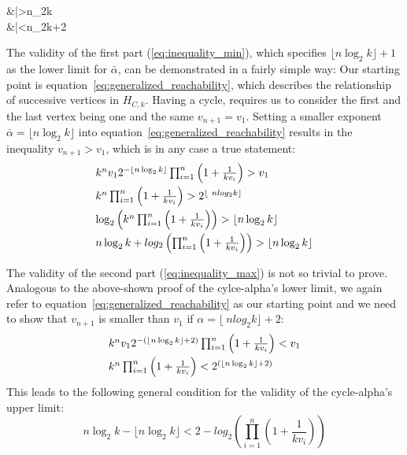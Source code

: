 \begin{samepage}
	\begin{flalign}
	\label{eq:inequality_min}
	&\bar\alpha>\lfloor n\log_2k\rfloor\\	
	\label{eq:inequality_max}
	&\bar\alpha<\lfloor n\log_2k\rfloor+2
	\end{flalign}
\end{samepage}

The validity of the first part (\ref{eq:inequality_min}), which specifies $\lfloor n\log_2k\rfloor+1$ as the lower limit for $\bar\alpha$, can be demonstrated in a fairly simple way: Our starting point is equation~\ref{eq:generalized_reachability}, which describes the relationship of successive vertices in $H_{C,k}$. Having a cycle, requires us to consider the first and the last vertex being one and the same $v_{n+1}=v_1$. Setting a smaller exponent $\bar\alpha=\lfloor n\log_2k\rfloor$ into equation~\ref{eq:generalized_reachability} results in the inequality $v_{n+1}>v_1$, which is in any case a true statement:
\begin{equation*}
\begin{array}{l}
k^nv_12^{-\lfloor n\log_2k\rfloor}\prod_{i=1}^{n}\left(1+\frac{1}{kv_{i}}\right)>v_1
\\[\medskipamount]
k^n\prod_{i=1}^{n}\left(1+\frac{1}{kv_{i}}\right)>2^{\lfloor\ nlog_2k\rfloor}
\\[\medskipamount]
\log_2\left(k^n\prod_{i=1}^{n}\left(1+\frac{1}{kv_{i}}\right)\right)>\lfloor n\log_2k\rfloor
\\[\medskipamount]
n\log_2k+log_2\left(\prod_{i=1}^{n}\left(1+\frac{1}{kv_{i}}\right)\right)>\lfloor n\log_2k\rfloor
\end{array}	
\end{equation*}

The validity of the second part (\ref{eq:inequality_max}) is not so trivial to prove. Analogous to the above-shown proof of the cylce-alpha's lower limit, we again refer to equation~\ref{eq:generalized_reachability} as our starting point and we need to show that $v_{n+1}$ is smaller than $v_1$ if $\alpha=\lfloor\ nlog_2k\rfloor+2$:
\begin{equation*}
\begin{array}{l}
k^nv_12^{-\left(\lfloor n\log_2k\rfloor+2\right)}\prod_{i=1}^{n}\left(1+\frac{1}{kv_{i}}\right)<v_1
\\[\medskipamount]
k^n\prod_{i=1}^{n}\left(1+\frac{1}{kv_{i}}\right)<2^{\left(\lfloor n\log_2k\rfloor+2\right)}
\end{array}	
\end{equation*}
This leads to the following general condition for the validity of the cycle-alpha's upper limit:
\begin{equation}
\label{eq:condition_max}
n\log_2k-\lfloor n\log_2k\rfloor<2-log_2\left(\prod_{i=1}^{n}\left(1+\frac{1}{kv_{i}}\right)\right)
\end{equation}

